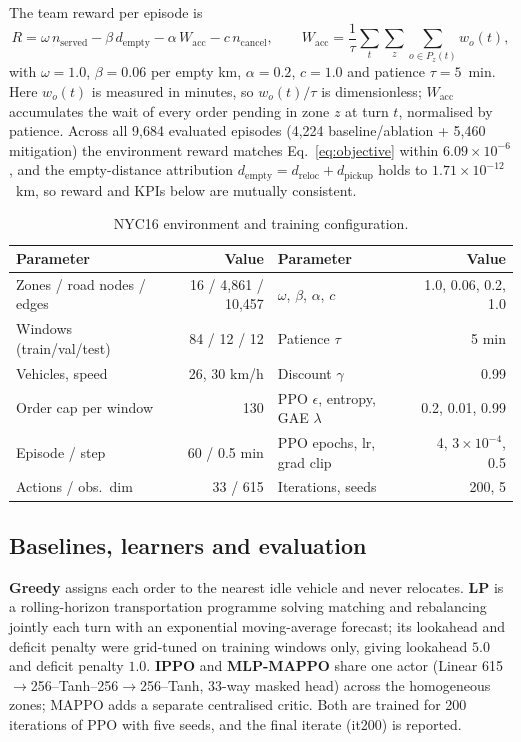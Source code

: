 \documentclass[3p,times,procedia]{elsarticle}
\begin{document}
The team reward per episode is
\begin{equation}
  R = \omega\, n_{\mathrm{served}} - \beta\, d_{\mathrm{empty}} - \alpha\, W_{\mathrm{acc}} - c\, n_{\mathrm{cancel}},
  \qquad
  W_{\mathrm{acc}} = \frac{1}{\tau}\sum_{t}\sum_{z}\sum_{o\in P_z(t)} w_o(t),
  \label{eq:objective}
\end{equation}
with $\omega=1.0$, $\beta=0.06$ per empty km, $\alpha=0.2$, $c=1.0$ and patience $\tau=5$~min. Here $w_o(t)$ is measured in minutes, so $w_o(t)/\tau$ is dimensionless; $W_{\mathrm{acc}}$ accumulates the wait of every order pending in zone $z$ at turn $t$, normalised by patience. Across all 9{,}684 evaluated episodes (4{,}224 baseline/ablation + 5{,}460 mitigation) the environment reward matches Eq.~\eqref{eq:objective} within $6.09\times10^{-6}$, and the empty-distance attribution $d_{\mathrm{empty}} = d_{\mathrm{reloc}} + d_{\mathrm{pickup}}$ holds to $1.71\times10^{-12}$~km, so reward and KPIs below are mutually consistent.

\begin{table}[tbp]
\centering
\caption{NYC16 environment and training configuration.}
\label{tab:params}
\footnotesize
\begin{tabular}{lr@{\hspace{2.2em}}lr}
\toprule
Parameter & Value & Parameter & Value \\
\midrule
Zones / road nodes / edges & 16 / 4{,}861 / 10{,}457 & $\omega$, $\beta$, $\alpha$, $c$ & 1.0, 0.06, 0.2, 1.0 \\
Windows (train/val/test) & 84 / 12 / 12 & Patience $\tau$ & 5 min \\
Vehicles, speed & 26, 30 km/h & Discount $\gamma$ & 0.99 \\
Order cap per window & 130 & PPO $\epsilon$, entropy, GAE $\lambda$ & 0.2, 0.01, 0.99 \\
Episode / step & 60 / 0.5 min & PPO epochs, lr, grad clip & 4, $3\times10^{-4}$, 0.5 \\
Actions / obs.\ dim & 33 / 615 & Iterations, seeds & 200, 5 \\
\bottomrule
\end{tabular}
\end{table}

\subsection{Baselines, learners and evaluation}
\label{sec:baselines}

\textbf{Greedy} assigns each order to the nearest idle vehicle and never relocates. \textbf{LP} is a rolling-horizon transportation programme solving matching and rebalancing jointly each turn with an exponential moving-average forecast; its lookahead and deficit penalty were grid-tuned on training windows only, giving lookahead $5.0$ and deficit penalty $1.0$. \textbf{IPPO} and \textbf{MLP-MAPPO} share one actor (Linear 615$\to$256--Tanh--256$\to$256--Tanh, 33-way masked head) across the homogeneous zones; MAPPO adds a separate centralised critic. Both are trained for 200 iterations of PPO with five seeds, and the final iterate (it200) is reported.
\end{document}
